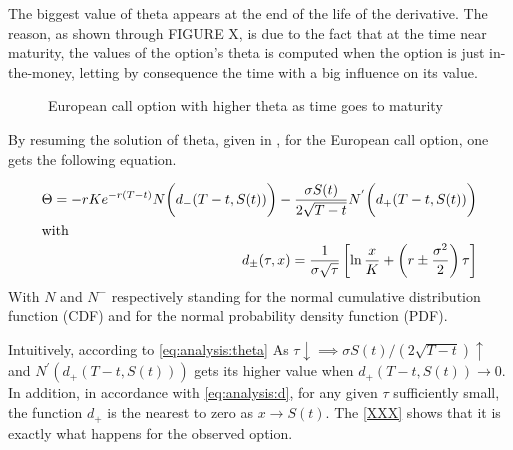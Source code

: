 \documentclass[12pt]{report}
\begin{document}
The biggest value of theta appears at the end of the life of the derivative. 
The reason, as shown through FIGURE X,  is due to the fact that at the time near maturity, the values of the option's theta is computed when the option is just in-the-money, letting by consequence the time with a big influence on its value.


\begin{figure}[ht]
  \centering
  
  \caption{European call option with higher theta as time goes to maturity}
  \label{p:analysis:gbm:pl:theta.high}
\end{figure}



By resuming the solution of theta, given in \citet{shreve}, for the European call option, one gets the following equation.

\begin{align}
  \Theta = -r K e^{-r (T-t)} N\bigg(d_{-}(T-t, S(t))\bigg) -
    \frac{\sigma S(t)}{2\sqrt{T-t}} N^{'}\bigg(d_{+}(T-t, S(t))\bigg) \label{eq:analysis:theta}\\
  \intertext{with}
  d_{\pm}(\tau, x) = \frac{1}{\sigma \sqrt{\tau}} \left [
    \ln\frac{x}{K} + \left( r \pm \frac{\sigma^2}{2} \right) \tau
  \right]\label{eq:analysis:d}
\end{align}
With $N$ and $N^{-}$ respectively standing for the normal cumulative distribution function (CDF) and for the normal probability density function (PDF). 

Intuitively, according to \cref{eq:analysis:theta} As $\tau \downarrow \implies \sigma S(t) / (2\sqrt{T-t}) \uparrow$ and $N^{'}(d_{+}(T-t, S(t)))$ gets its higher value when $d_{+}(T-t, S(t)) \to 0$.
In addition, in accordance with \cref{eq:analysis:d}, for any given $\tau$ sufficiently small, the function $d_{+}$ is the nearest to zero as $x \to S(t)$.
The \cref{XXX} shows that it is exactly what happens for the observed option.
















\end{document}
